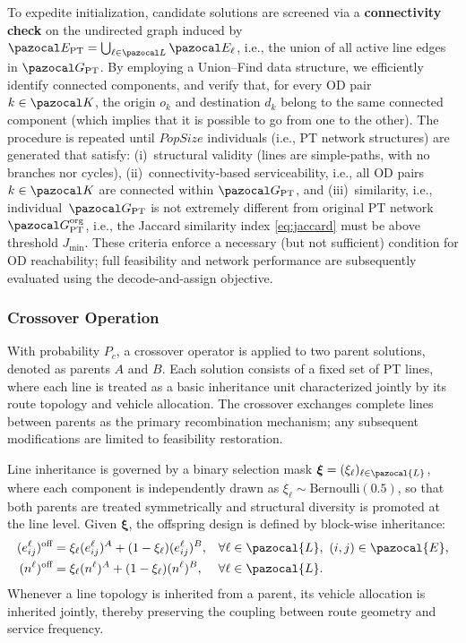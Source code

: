 \documentclass[a4paper,fleqn]{cas-sc}
\begin{document}
To expedite initialization, candidate solutions are screened via a \textbf{connectivity check} on the undirected graph induced by
$\pazocal E_{\text{PT}} = \bigcup_{\ell\in\pazocal L} \pazocal E_\ell$,
i.e., the union of all active line edges in $\pazocal G_{\text{PT}}$.
By employing a Union--Find data structure, we efficiently identify connected components, and verify that, for every OD pair $k\in\pazocal K$, the origin $o_k$ and destination $d_k$
belong to the same connected component (which implies that it is possible to go from one to the other).
%
The procedure is repeated until $\textit{PopSize}$ individuals (i.e., PT network structures) are generated that satisfy:
(i)~structural validity (lines are simple-paths, with no branches nor cycles),
(ii)~connectivity-based serviceability, i.e., all OD pairs $k\in\pazocal K$ are connected within $\pazocal G_{\text{PT}}$,
and (iii)~similarity, i.e., individual~$\pazocal G_\text{PT}$ is not extremely different from original PT network~$\pazocal G_\text{PT}^\text{org}$, i.e., the Jaccard similarity index \eqref{eq:jaccard} must be above threshold $J_{\min}$.
These criteria enforce a necessary (but not sufficient) condition for OD reachability; full feasibility and network performance are subsequently evaluated using the decode-and-assign objective.

\subsubsection{Crossover Operation}\label{sec:crossover}

With probability $P_c$, a crossover operator is applied to two parent solutions, denoted as parents $A$ and $B$.
Each solution consists of a fixed set of PT lines, where each line is treated as a basic inheritance unit characterized jointly by its route topology and vehicle allocation.
The crossover exchanges complete lines between parents as the primary recombination mechanism; any subsequent modifications are limited to feasibility restoration.

Line inheritance is governed by a binary selection mask $\boldsymbol{\xi}=(\xi_\ell)_{\ell\in\pazocal{L}}$, where each component is independently drawn as $\xi_\ell \sim \mathrm{Bernoulli}(0.5)$,
so that both parents are treated symmetrically and structural diversity is promoted at the line level.
%
Given $\boldsymbol{\xi}$, the offspring design is defined by block-wise inheritance:
\begin{align}
(e_{ij}^\ell)^{\text{off}}
&=
\xi_\ell (e_{ij}^\ell)^{A} + (1-\xi_\ell)(e_{ij}^\ell)^{B},
&& \forall \ell\in\pazocal{L},\ (i,j)\in\pazocal{E},
\label{eq:crossover_edges}\\
(n^\ell)^{\text{off}}
&=
\xi_\ell (n^\ell)^{A} + (1-\xi_\ell)(n^\ell)^{B},
&& \forall \ell\in\pazocal{L}.
\label{eq:crossover_fleet}
\end{align}
Whenever a line topology is inherited from a parent, its vehicle allocation is inherited jointly, thereby preserving the coupling between route geometry and service frequency.
\end{document}
